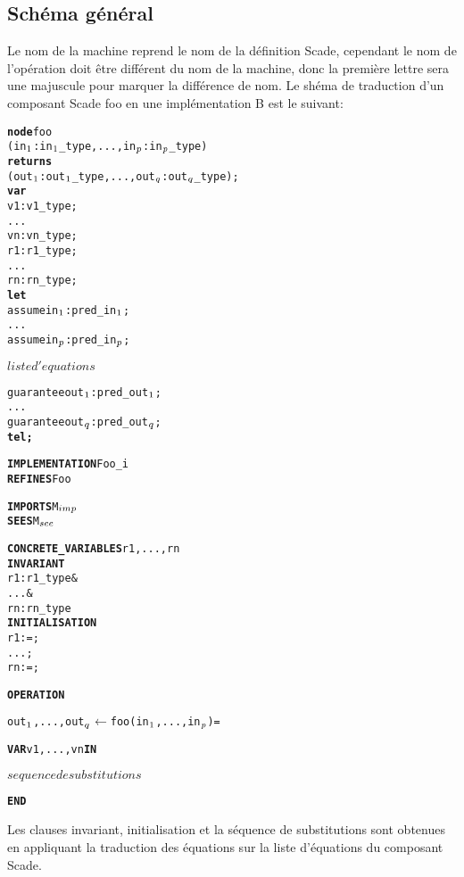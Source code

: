 \subsection{Schéma général}

Le nom de la machine reprend le nom de la
définition Scade, cependant le nom de l'opération doit être différent du nom de
la machine, donc la première lettre sera une majuscule pour marquer la
différence de nom. 
Le shéma de traduction d'un composant Scade foo en une implémentation B est
le suivant:


\setlength{\columnseprule}{0.05cm}
\begin{multicols}{2}
\begin{alltt}
\textbf{node} foo 
  (in\(\sb{1}\): in\(\sb{1}\)\_type, ..., in\(\sb{p}\): in\(\sb{p}\)\_type) 
  \textbf{returns}
  (out\(\sb{1}\): out\(\sb{1}\)\_type, ..., out\(\sb{q}\): out\(\sb{q}\)\_type);
\textbf{var}
  v1 : v1\_type;
  ...
  vn : vn\_type;
  r1 : r1\_type;
  ...
  rn : rn\_type;
\textbf{let}
  assume in\(\sb{1}\) : pred\_in\(\sb{1}\);
  ...
  assume in\(\sb{p}\) : pred\_in\(\sb{p}\);

  \(liste d'equations\)

  guarantee out\(\sb{1}\) : pred\_out\(\sb{1}\);
  ...
  guarantee out\(\sb{q}\) : pred\_out\(\sb{q}\);
\textbf{tel;}
\end{alltt}

\columnbreak

\begin{alltt}
\textbf{IMPLEMENTATION} Foo_i
\textbf{REFINES} Foo

\textbf{IMPORTS} M\(\sb{imp}\)
\textbf{SEES} M\(\sb{see}\)

\textbf{CONCRETE\_VARIABLES} r1, ..., rn
\textbf{INVARIANT}
  r1 : r1\_type &
  ... &
  rn : rn\_type
\textbf{INITIALISATION}
  r1 := ;
  ... ;
  rn := ;

\textbf{OPERATION}

out\(\sb{1}\), ..., out\(\sb{q}\) \(\leftarrow\) foo(in\(\sb{1}\), ..., in\(\sb{p}\)) =
  
\textbf{VAR} v1, ..., vn \textbf{IN}
  
  \(sequence de substitutions\)

\textbf{END}
\end{alltt}
\end{multicols}

Les clauses invariant, initialisation et la séquence de substitutions
sont obtenues en appliquant la traduction des équations
sur la liste d'équations du composant Scade.

